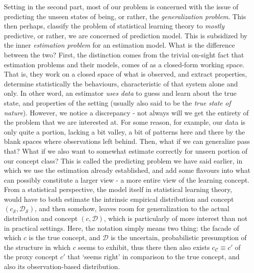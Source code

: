 \documentclass[
  journal=largetwo,
  year=2025,
  volume=37,
]{cup-journal}
\begin{document}
Setting in the second part, most of our problem is concerned with the issue of predicting the unseen states of being, or rather, the \textit{generalization problem}. This then perhaps, classify the problem of statistical learning theory to \textit{mostly} predictive, or rather, we are concerned of prediction model. This is subsidized by the inner \textit{estimation problem} for an estimation model. What is the difference between the two? First, the distinction comes from the trivial on-sight fact that estimation problems and their models, comes of as a closed-form working space. That is, they work on a closed space of what is observed, and extract properties, determine statistically the behaviours, characteristic of that system alone and only. In other word, an estimator \textit{uses data} to guess and learn about the true state, and properties of the setting (usually also said to be the \textit{true state of nature}). However, we notice a discrepancy - not always will we get the entirety of the problem that we are interested at. For some reason, for example, our data is only quite a portion, lacking a bit valley, a bit of patterns here and there by the blank spaces where observations left behind. Then, what if we can generalize pass that? What if we also want to somewhat estimate correctly for unseen portion of our concept class? This is called the predicting problem we have said earlier, in which we use the estimation already established, and add some flavours into what can possibly constitute a larger view - a more entire view of the learning concept. From a statistical perspective, the model itself in statistical learning theory, would have to both estimate the intrinsic empirical distribution and concept $(c_{\mathcal{S}},\mathcal{D}_{\mathcal{S}})$, and then somehow, leaves room for generalization to the actual distribution and concept $(c,\mathcal{D})$, which is particularly of more interest than not in practical settings. Here, the notation simply means two thing: the facade of which $c$ is the true concept, and $\mathcal{D}$ is the uncertain, probabilistic presumption of the structure in which $c$ seems to exhibit, thus there then also exists $c_{\mathcal{C}}\equiv c'$ of the proxy concept $c'$ that `seems right' in comparison to the true concept, and also its observation-based distribution. 
\end{document}
